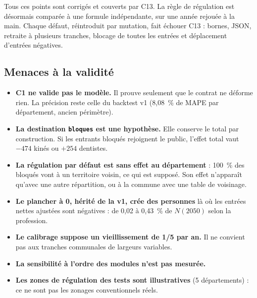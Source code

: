 \documentclass[11pt]{article}
\begin{document}
Tous ces points sont corrigés et couverts par C13. La règle de régulation est désormais comparée à
une formule indépendante, sur une année rejouée à la main. Chaque défaut, réintroduit par mutation,
fait échouer C13 : bornes, JSON, retraite à plusieurs tranches, blocage de toutes les entrées et
déplacement d'entrées négatives.

\subsection{Menaces à la validité}
\begin{itemize}
  \item \textbf{C1 ne valide pas le modèle.} Il prouve seulement que le contrat ne déforme rien. La
        précision reste celle du backtest v1 (8,08\mesure{}~\% de MAPE par département, ancien
        périmètre).
  \item \textbf{La destination \texttt{bloques} est une hypothèse.} Elle conserve le total par
        construction. Si les entrants bloqués rejoignent le public, l'effet total vaut
        $-474$\mesure{} kinés ou $+254$\mesure{} dentistes.
  \item \textbf{La régulation par défaut est sans effet au département} : 100~\% des bloqués vont à
        un territoire voisin, ce qui est supposé. Son effet n'apparaît qu'avec une autre répartition,
        ou à la commune avec une table de voisinage.
  \item \textbf{Le plancher à 0, hérité de la v1, crée des personnes} là où les entrées nettes
        ajustées sont négatives : de 0,02\mesure{} à 0,43\mesure{}~\% de $N(2050)$ selon la
        profession.
  \item \textbf{Le calibrage suppose un vieillissement de 1/5 par an.} Il ne convient pas aux tranches
        communales de largeurs variables.
  \item \textbf{La sensibilité à l'ordre des modules n'est pas mesurée.}
  \item \textbf{Les zones de régulation des tests sont illustratives} (5 départements) : ce ne sont
        pas les zonages conventionnels réels.
\end{itemize}

\end{document}
